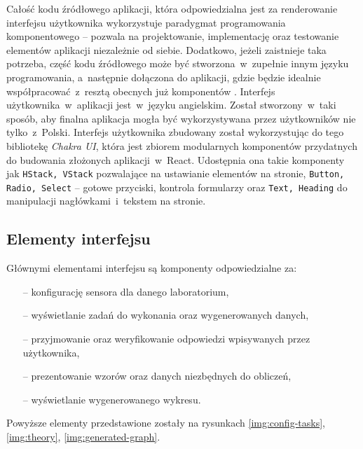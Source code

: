 Całość kodu źródłowego aplikacji, która odpowiedzialna jest za renderowanie interfejsu użytkownika wykorzystuje
paradygmat programowania komponentowego -- pozwala na projektowanie, implementację oraz testowanie elementów aplikacji
niezależnie od siebie. Dodatkowo, jeżeli zaistnieje taka potrzeba, część kodu źródłowego może być stworzona~w~zupełnie
innym języku programowania, a~następnie dołączona do aplikacji, gdzie będzie idealnie współpracować~z~resztą obecnych
już komponentów \cite{component-programming}. Interfejs użytkownika~w~aplikacji jest~w~języku angielskim. Został
stworzony~w~taki sposób, aby finalna aplikacja mogła być wykorzystywana przez użytkowników nie tylko~z~Polski.
Interfejs użytkownika zbudowany został wykorzystując do tego bibliotekę \textit{Chakra UI}, która jest zbiorem
modularnych komponentów przydatnych do budowania złożonych aplikacji~w~React. Udostępnia ona takie komponenty
jak \texttt{HStack, VStack} pozwalające na ustawianie elementów na stronie, \texttt{Button, Radio, Select} -- gotowe
przyciski, kontrola formularzy oraz \texttt{Text, Heading} do manipulacji nagłówkami~i~tekstem na stronie.

\subsection{Elementy interfejsu}
Głównymi elementami interfejsu są komponenty odpowiedzialne za:
\begin{itemize}
  \item[--] konfigurację sensora dla danego laboratorium,
  \item[--] wyświetlanie zadań do wykonania oraz wygenerowanych danych,
  \item[--] przyjmowanie oraz weryfikowanie odpowiedzi wpisywanych przez użytkownika,
  \item[--] prezentowanie wzorów oraz danych niezbędnych do obliczeń,
  \item[--] wyświetlanie wygenerowanego wykresu.
\end{itemize}
Powyższe elementy przedstawione zostały na rysunkach \ref{img:config-tasks}, \ref{img:theory},
\ref{img:generated-graph}.

\begingroup
{}


